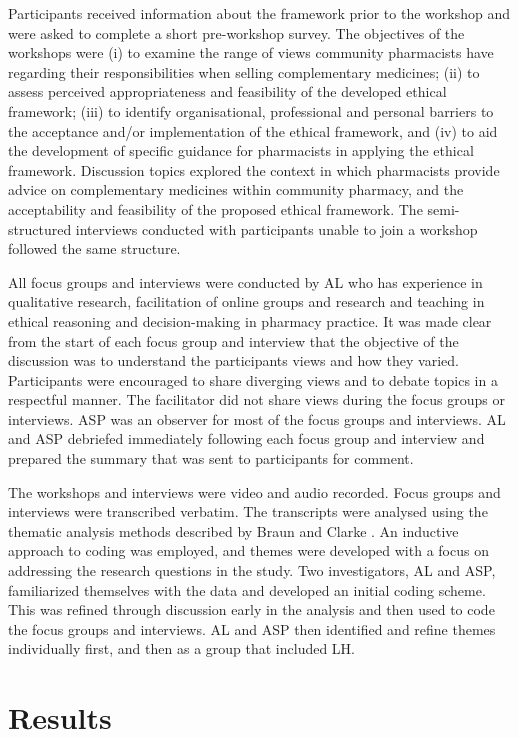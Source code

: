 \documentclass[11pt,a4paper]{article}
\begin{document}
Participants received information about the framework prior to the
workshop and were asked to complete a short pre-workshop survey. The
objectives of the workshops were (i) to examine the range of views
community pharmacists have regarding their responsibilities when selling
complementary medicines; (ii) to assess perceived appropriateness and
feasibility of the developed ethical framework; (iii) to identify
organisational, professional and personal barriers to the acceptance
and/or implementation of the ethical framework, and (iv) to aid the
development of specific guidance for pharmacists in applying the ethical
framework. Discussion topics explored the context in which pharmacists
provide advice on complementary medicines within community pharmacy, and
the acceptability and feasibility of the proposed ethical framework. The
semi-structured interviews conducted with participants unable to join a
workshop followed the same structure.

All focus groups and interviews were conducted by AL who has experience
in qualitative research, facilitation of online groups and research and
teaching in ethical reasoning and decision-making in pharmacy practice.
It was made clear from the start of each focus group and interview that
the objective of the discussion was to understand the participants views
and how they varied. Participants were encouraged to share diverging
views and to debate topics in a respectful manner. The facilitator did
not share views during the focus groups or interviews. ASP was an
observer for most of the focus groups and interviews. AL and ASP
debriefed immediately following each focus group and interview and
prepared the summary that was sent to participants for comment.

The workshops and interviews were video and audio recorded. Focus groups
and interviews were transcribed verbatim. The transcripts were analysed
using the thematic analysis methods described by Braun and Clarke
\autocite{Braun2016}. An inductive approach to coding was employed, and
themes were developed with a focus on addressing the research questions
in the study. Two investigators, AL and ASP, familiarized themselves
with the data and developed an initial coding scheme. This was refined
through discussion early in the analysis and then used to code the focus
groups and interviews. AL and ASP then identified and refine themes
individually first, and then as a group that included LH.

\section{Results}\label{results}
\end{document}
